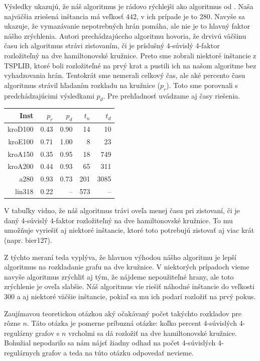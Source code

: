 Výsledky ukazujú, že náš algoritmus je rádovo rýchlejši ako algoritmus od \cite{duchenne}.
Naša najväčšia zriešená inštancia má veľkosť $442$, v ich prípade je to $280$.
Navyše sa ukazuje, že vymazávanie nepotrebných hrán pomáha, ale nie je to hlavný faktor nášho
zrýchlenia. Autori prechádzajúceho algoritmu hovoria, že drvivú väčšinu času ich algoritmus strávi
zistovaním, či je príslušný 4-súvislý 4-faktor rozložiteľný na dve hamiltonovské kružnice.
Preto sme zobrali niektoré inštancie z TSPLIB, ktoré boli rozložiteľné na prvý krat
a pustili ich na našom algoritme bez vyhadzovania hrán. Tentokrát sme nemerali celkový čas, ale
aké percento času algoritmus strávil hľadaním rozkladu na kružnice ($p_r$). Toto sme porovnali s
predchádzajúcimi výsledkami $p_d$. Pre prehľadnosť uvádzame aj časy riešenia.

\begin{table}[h]
\centering
\begin{tabular}{|r|r|r|r|r|}
\hline
Inst   & $p_r$ & $p_d$ & $t_n$ & $t_d$ \\\hline
kroD100& 0.43  & 0.90  & 14    & 10 \\\hline
kroE100& 0.71  & 1.00  & 8     & 23 \\\hline
kroA150& 0.35  & 0.95  & 18    & 749 \\\hline
kroA200& 0.44  & 0.93  & 65    & 311 \\\hline
a280   & 0.93  & 0.73  & 201   & 3085 \\\hline
lin318 & 0.22  & --    & 573   & -- \\\hline 
\end{tabular}
\end{table}

V tabuľky vidno, že náš algoritmus trávi oveľa menej času pri zistovaní, či je daný 4-súvislý
4-faktor rozložiteľný na dve hamiltonovské kružnice. To mu umožňuje vyriešiť aj niektoré inštancie,
ktoré toto potrebujú zistovať aj viac krát (napr. bier127).

\bigskip

Z týchto meraní teda vyplýva, že hlavnou výhodou nášho algoritmu je lepší algoritmus na rozkladanie
grafu na dve kružnice. V niektorých prípadoch vieme navyše algoritmus zrýchliť aj tým, že nájdeme
nepoužiteľné hrany, ale toto zrýchlenie je oveľa slabšie. Náš algoritmus vie riešiť náhodné
inštancie do veľkosti 300 a aj niektoré väčšie inštancie, pokiaľ sa mu ich podarí rozložiť na prvý
pokus.

Zaujímavou teoretickou otázkou aký očakávaný počet takýchto rozkladov pre rôzne $n$.
Táto otázka je pomerne príbuzná otázke: koľko percent 4-súvislých 4-regulárny grafov s $n$ vrcholmi
sa dá rozložiť na dve hamiltonovské kružnice. Bohužial nepodarilo sa nám nájsť žiadny odhad
na počet 4-súvislých 4-regulárnych grafov a teda na túto otázku odpovedať nevieme.


